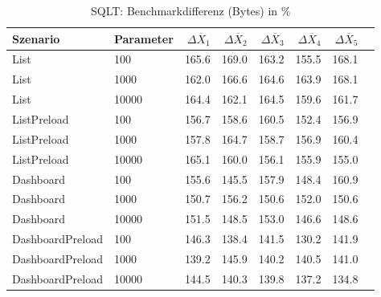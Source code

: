 
\begin{table}[ht]
\setlength{\extrarowheight}{-1pt}
\centering
\caption{SQLT: Benchmarkdifferenz (Bytes) in \%}
\begin{tabular}{llrrrrrr}
\toprule
Szenario & Parameter & ${\Delta \overline{X}_1}$ & ${\Delta \overline{X}_2}$ & ${\Delta \overline{X}_3}$ & ${\Delta \overline{X}_4}$ & ${\Delta \overline{X}_5}$ \\
\midrule
	List & 100 & \cellcolor{red!30}  165.6 & \cellcolor{red!30}  169.0 & \cellcolor{red!30}  163.2 & \cellcolor{red!30}  155.5 & \cellcolor{red!30}  168.1 \\
	List & 1000 & \cellcolor{red!30}  162.0 & \cellcolor{red!30}  166.6 & \cellcolor{red!30}  164.6 & \cellcolor{red!30}  163.9 & \cellcolor{red!30}  168.1 \\
	List & 10000 & \cellcolor{red!30}  164.4 & \cellcolor{red!30}  162.1 & \cellcolor{red!30}  164.5 & \cellcolor{red!30}  159.6 & \cellcolor{red!30}  161.7 \\
	ListPreload & 100 & \cellcolor{red!30}  156.7 & \cellcolor{red!30}  158.6 & \cellcolor{red!30}  160.5 & \cellcolor{red!30}  152.4 & \cellcolor{red!30}  156.9 \\
	ListPreload & 1000 & \cellcolor{red!30}  157.8 & \cellcolor{red!30}  164.7 & \cellcolor{red!30}  158.7 & \cellcolor{red!30}  156.9 & \cellcolor{red!30}  160.4 \\
	ListPreload & 10000 & \cellcolor{red!30}  165.1 & \cellcolor{red!30}  160.0 & \cellcolor{red!30}  156.1 & \cellcolor{red!30}  155.9 & \cellcolor{red!30}  155.0 \\
	Dashboard & 100 & \cellcolor{red!30}  155.6 & \cellcolor{red!28}  145.5 & \cellcolor{red!30}  157.9 & \cellcolor{red!29}  148.4 & \cellcolor{red!30}  160.9 \\
	Dashboard & 1000 & \cellcolor{red!30}  150.7 & \cellcolor{red!30}  156.2 & \cellcolor{red!30}  150.6 & \cellcolor{red!30}  152.0 & \cellcolor{red!30}  150.6 \\
	Dashboard & 10000 & \cellcolor{red!30}  151.5 & \cellcolor{red!29}  148.5 & \cellcolor{red!30}  153.0 & \cellcolor{red!29}  146.6 & \cellcolor{red!29}  148.6 \\
	DashboardPreload & 100 & \cellcolor{red!29}  146.3 & \cellcolor{red!25}  138.4 & \cellcolor{red!27}  141.5 & \cellcolor{red!22}  130.2 & \cellcolor{red!27}  141.9 \\
	DashboardPreload & 1000 & \cellcolor{red!26}  139.2 & \cellcolor{red!28}  145.9 & \cellcolor{red!26}  140.2 & \cellcolor{red!26}  140.5 & \cellcolor{red!26}  141.0 \\
	DashboardPreload & 10000 & \cellcolor{red!28}  144.5 & \cellcolor{red!26}  140.3 & \cellcolor{red!26}  139.8 & \cellcolor{red!25}  137.2 & \cellcolor{red!24}  134.8 \\
\bottomrule
\end{tabular}
\label{tab:benchmarkdifferenz_sqlt_bytes}
\end{table}
	